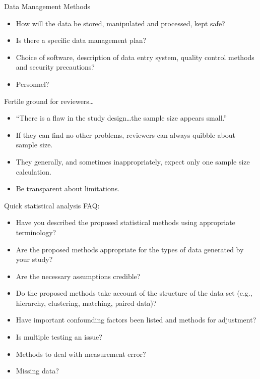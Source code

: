 \documentclass[ignorenonframetext,]{beamer}
\providecommand{\tightlist}{%
  \setlength{\itemsep}{0pt}\setlength{\parskip}{0pt}}
\begin{document}
\begin{frame}{Data Management Methods}
\protect\hypertarget{data-management-methods}{}

\begin{itemize}
\item
  How will the data be stored, manipulated and processed, kept safe?
\item
  Is there a specific data management plan?
\item
  Choice of software, description of data entry system, quality control
  methods and security precautions?
\item
  Personnel?
\end{itemize}

\end{frame}

\begin{frame}{Fertile ground for reviewers\ldots{}}
\protect\hypertarget{fertile-ground-for-reviewers}{}

\begin{itemize}
\item
  ``There is a flaw in the study design\ldots{}the sample size appears
  small.''
\item
  If they can find no other problems, reviewers can always quibble about
  sample size.
\item
  They generally, and sometimes inappropriately, expect only one sample
  size calculation.
\item
  Be transparent about limitations.
\end{itemize}

\end{frame}

\begin{frame}{Quick statistical analysis FAQ:}
\protect\hypertarget{quick-statistical-analysis-faq}{}

\begin{itemize}
\tightlist
\item
  Have you described the proposed statistical methods using appropriate
  terminology?
\item
  Are the proposed methods appropriate for the types of data generated
  by your study?
\item
  Are the necessary assumptions credible?
\item
  Do the proposed methods take account of the structure of the data set
  (e.g., hierarchy, clustering, matching, paired data)?
\item
  Have important confounding factors been listed and methods for
  adjustment?
\item
  Is multiple testing an issue?
\item
  Methods to deal with measurement error?
\item
  Missing data?
\end{itemize}

\end{frame}
\end{document}
